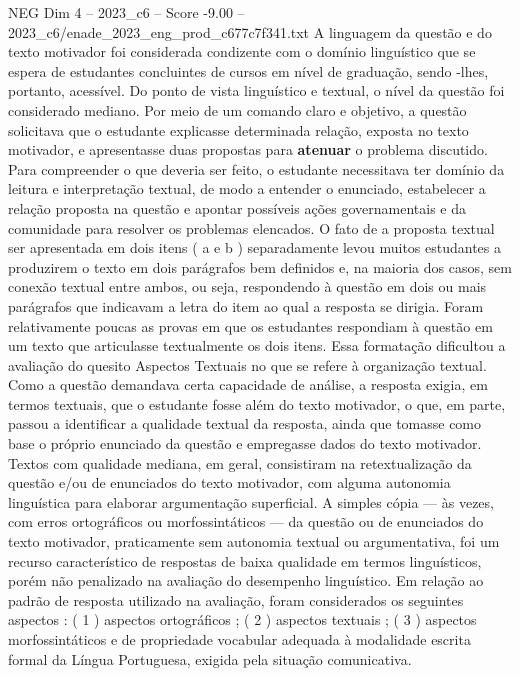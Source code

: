 \begin{textsample}{NEG Dim 4 – 2023\_c6 – Score -9.00 – 2023\_c6/enade\_2023\_eng\_prod\_c677c7f341.txt}
A linguagem da questão e do texto motivador foi considerada condizente com o domínio linguístico que se espera de estudantes concluintes de cursos em nível de graduação, sendo -lhes, portanto, acessível.
Do ponto de vista linguístico e textual, o nível da questão foi considerado mediano.
Por meio de um comando claro e objetivo, a questão solicitava que o estudante explicasse determinada relação, exposta no texto motivador, e apresentasse duas propostas para \textbf{atenuar} o problema discutido.
Para compreender o que deveria ser feito, o estudante necessitava ter domínio da leitura e interpretação textual, de modo a entender o enunciado, estabelecer a relação proposta na questão e apontar possíveis ações governamentais e da comunidade para resolver os problemas elencados.
O fato de a proposta textual ser apresentada em dois itens ( a e b ) separadamente levou muitos estudantes a produzirem o texto em dois parágrafos bem definidos e, na maioria dos casos, sem conexão textual entre ambos, ou seja, respondendo à questão em dois ou mais parágrafos que indicavam a letra do item ao qual a resposta se dirigia.
Foram relativamente poucas as provas em que os estudantes respondiam à questão em um texto que articulasse textualmente os dois itens.
Essa formatação dificultou a avaliação do quesito Aspectos Textuais no que se refere à organização textual.
Como a questão demandava certa capacidade de análise, a resposta exigia, em termos textuais, que o estudante fosse além do texto motivador, o que, em parte, passou a identificar a qualidade textual da resposta, ainda que tomasse como base o próprio enunciado da questão e empregasse dados do texto motivador.
Textos com qualidade mediana, em geral, consistiram na retextualização da questão e/ou de enunciados do texto motivador, com alguma autonomia linguística para elaborar argumentação superficial.
A simples cópia — às vezes, com erros ortográficos ou morfossintáticos — da questão ou de enunciados do texto motivador, praticamente sem autonomia textual ou argumentativa, foi um recurso característico de respostas de baixa qualidade em termos linguísticos, porém não penalizado na avaliação do desempenho linguístico.
Em relação ao padrão de resposta utilizado na avaliação, foram considerados os seguintes aspectos : ( 1 ) aspectos ortográficos ; ( 2 ) aspectos textuais ; ( 3 ) aspectos morfossintáticos e de propriedade vocabular adequada à modalidade escrita formal da Língua Portuguesa, exigida pela situação comunicativa.

\end{textsample}
